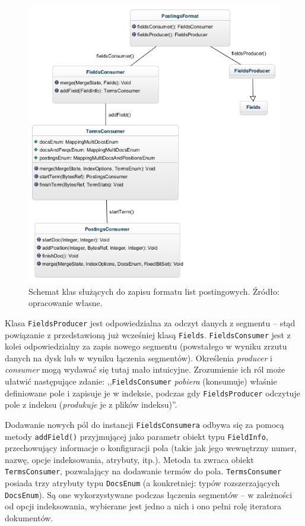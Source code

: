 \begin{figure}[p]
 \includegraphics[scale=0.65]{pictures/PostingsFormat_1.jpg}
 \caption{Schemat klas służących do zapisu formatu list postingowych. Źródło: opracowanie własne.\label{fig:postingFormat}}
\end{figure}

Klasa \texttt{FieldsProducer} jest odpowiedzialna za odczyt danych z segmentu -- stąd powiązanie z przedstawioną już wcześniej klasą \texttt{Fields}. \texttt{FieldsConsumer} jest z kolei odpowiedzialny za zapis nowego segmentu (powstałego w wyniku zrzutu danych na dysk lub w wyniku łączenia segmentów). Określenia \emph{producer} i \emph{consumer} mogą wydawać się tutaj mało intuicyjne. Zrozumienie ich ról może ułatwić następujące zdanie: ,,\texttt{FieldsConsumer} \emph{pobiera} (konsumuje) właśnie definiowane pole i zapisuje je w indeksie, podczas gdy \texttt{FieldsProducer} odczytuje pole z indeksu (\emph{produkuje} je z plików indeksu)''.

Dodawanie nowych pól do instancji \texttt{FieldsConsumera} odbywa się za pomocą metody \texttt{addField()} przyjmującej jako parametr obiekt typu \texttt{FieldInfo}, przechowujący informacje o konfiguracji pola (takie jak jego wewnętrzny numer, nazwę, opcje indeksowania, atrybuty, itp.). Metoda ta zwraca obiekt \texttt{TermsConsumer}, pozwalający na dodawanie termów do pola. \texttt{TermsConsumer} posiada trzy atrybuty typu \texttt{DocsEnum} (a konkretniej: typów rozszerzających \texttt{DocsEnum}). Są one wykorzystywane podczas łączenia segmentów -- w zależności od opcji indeksowania, wybierane jest jedno a nich i ono pełni rolę iteratora dokumentów.

